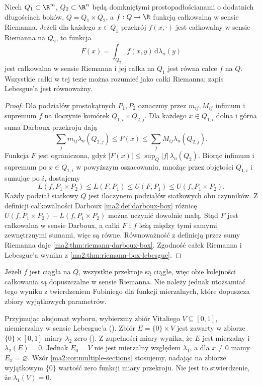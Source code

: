 \begin{stwierdzenie}
\label{ma2:prop:multiple-riemann}
Niech $Q_1\subset\R^m$, $Q_2\subset\R^n$ będą
domkniętymi prostopadłościanami o dodatnich
długościach boków, $Q=Q_1\times Q_2$, a $f:Q\to\R$ funkcją całkowalną
w sensie Riemanna. Jeżeli dla każdego $x\in Q_1$
przekrój $f(x,\cdot)$ jest całkowalny w sensie
Riemanna na $Q_2$, to funkcja
\[
 F(x)=\int_{Q_2}f(x,y)\,\mathrm d\lambda_n(y)
\]
jest całkowalna w sensie Riemanna i jej całka
na $Q_1$ jest równa całce $f$ na $Q$.
Wszystkie całki w tej tezie można rozumieć jako
całki Riemanna; zapis Lebesgue'a jest równoważny.
\end{stwierdzenie}
\begin{proof}
Dla podziałów prostokątnych $P_1,P_2$ oznaczmy
przez $m_{ij},M_{ij}$ infimum i supremum $f$
na iloczynie komórek $Q_{1,i}\times Q_{2,j}$.
Dla każdego $x\in Q_{1,i}$ dolna i górna suma
Darboux przekroju dają
\[
 \sum_j m_{ij}\lambda_n(Q_{2,j})
 \le F(x)\le
 \sum_j M_{ij}\lambda_n(Q_{2,j}).
\]
Funkcja $F$ jest ograniczona, gdyż $|F(x)|\le
\sup_Q|f|\,\lambda_n(Q_2)$. Biorąc infimum
i supremum po $x\in Q_{1,i}$ w powyższym
oszacowaniu, mnożąc przez objętości $Q_{1,i}$
i sumując po $i$, dostajemy
\[
 L(f,P_1\times P_2)\le L(F,P_1)
 \le U(F,P_1)\le U(f,P_1\times P_2).
\]
Każdy podział siatkowy $Q$ jest iloczynem
podziałów siatkowych obu czynników. Z definicji całkowalności Darboux
\ref{ma2:def:darboux-box} różnicę
$U(f,P_1\times P_2)-L(f,P_1\times P_2)$
można uczynić dowolnie małą. Stąd $F$ jest
całkowalna w sensie Darboux, a całki $F$ i $f$
leżą między tymi samymi zewnętrznymi sumami,
więc są równe. Równoważność z definicją przez
sumy Riemanna daje \ref{ma2:thm:riemann-darboux-box}. Zgodność całek Riemanna
i Lebesgue'a wynika z
\ref{ma2:thm:riemann-box-lebesgue}.
\end{proof}

Jeżeli $f$ jest ciągła na $Q$, wszystkie
przekroje są ciągłe, więc obie kolejności
całkowania są dopuszczalne w sensie Riemanna.
Nie należy jednak utożsamiać tego wyniku
z twierdzeniem Fubiniego dla funkcji mierzalnych,
które dopuszcza zbiory wyjątkowych parametrów.

\begin{przyklad}
\label{ma2:ex:multiple-nonmeasurable-section}
Przyjmując aksjomat wyboru, wybierzmy zbiór
Vitaliego $V\subseteq[0,1]$, niemierzalny
w sensie Lebesgue'a
().
Zbiór $E=\{0\}\times V$ jest zawarty
w zbiorze $\{0\}\times[0,1]$ miary $\lambda_2$
zero ().
Z zupełności miary wynika, że $E$
jest mierzalny i $\lambda_2(E)=0$.
Jednak $E_0=V$ nie jest mierzalny względem
$\lambda_1$, a dla $x\ne0$ mamy $E_x=\varnothing$.
Wzór \ref{ma2:cor:multiple-sections} stosujemy,
nadając na zbiorze wyjątkowym $\{0\}$ wartość
zero funkcji miary przekroju. Nie jest to
stwierdzenie, że $\lambda_1(V)=0$.
\end{przyklad}

